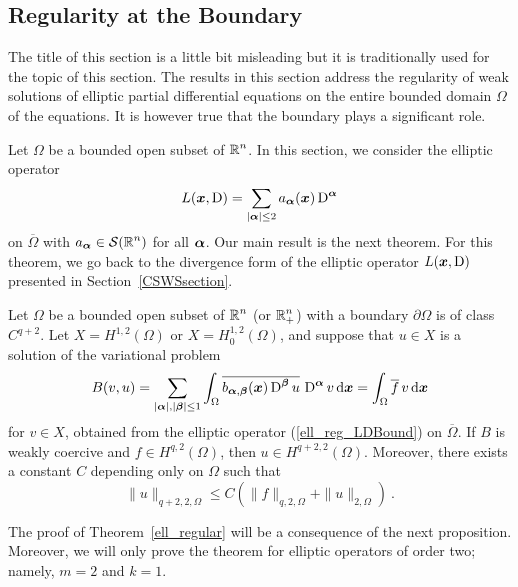 \subsection{Regularity at the Boundary} \label{ell_sect_RB}

The title of this section is a little bit misleading but it is
traditionally used for the topic of this section.
The results in this section address the regularity of weak solutions
of elliptic partial differential equations on the entire bounded
domain $\Omega$ of the equations.  It is however true that the
boundary plays a significant role.

Let $\Omega$ be a bounded open subset of $\displaystyle \mathbb{R}^n$.  In
this section, we consider the elliptic operator 
\begin{equation} \label{ell_reg_LDBound}
L({\bm{x}},\operatorname{D}) = \sum_{|{\bm{\alpha}}|\leq 2}
a_{{\bm{\alpha}}}({\bm{x}}) \operatorname{D}^{{\bm{\alpha}}}
\end{equation}
on $\overline{\Omega}$ with $\displaystyle a_{{\bm{\alpha}}} \in \mathcal{S}(\mathbb{R}^n)$
for all ${\bm{\alpha}}$.  Our main result is the next theorem.
For this theorem, we go back to the divergence form of the
elliptic operator $L({\bm{x}},\operatorname{D})$ presented in
Section~\ref{CSWSsection}.

\begin{theorem} \label{ell_regular}
Let $\Omega$ be a bounded open subset of $\displaystyle \mathbb{R}^n$
(or $\displaystyle \mathbb{R}^n_+$)
with a boundary $\partial \Omega$ is of class $\displaystyle C^{q+2}$.  Let
$\displaystyle X = H^{1,2}(\Omega)$ or
$\displaystyle X = H^{1,2}_0(\Omega)$, and suppose that
$u\in X$ is a solution of the variational problem
\[
B(v,u) = \sum_{|{\bm{\alpha}}|,|{\bm{\beta}}|\leq 1}
\int_\Omega \overline{b_{{\bm{\alpha}},{\bm{\beta}}}({\bm{x}})
\operatorname{D}^{{\bm{\beta}}} u}\, \operatorname{D}^{{\bm{\alpha}}} v
\,\mathrm{d}{{\bm{x}}} = \int_\Omega \overline{f}\,v \,\mathrm{d}{{\bm{x}}}
\]
for $\displaystyle v \in X$,
obtained from the elliptic operator (\ref{ell_reg_LDBound}) on
$\overline{\Omega}$.  If $B$ is weakly coercive and
$\displaystyle f \in H^{q,2}(\Omega)$, then
$\displaystyle u\in H^{q+2,2}(\Omega)$.  Moreover, there exists a constant $C$
depending only on $\Omega$ such that
\begin{equation} \label{ell_norm_reg}
\|u\|_{q+2,2,\Omega} \leq C \left( \|f\|_{q,2,\Omega}
+ \|u\|_{2,\Omega} \right) \ .
\end{equation}
\end{theorem}

The proof of Theorem~\ref{ell_regular} will be a consequence of the
next proposition.  Moreover, we will only prove the theorem for
elliptic operators of order two; namely, $m=2$ and $k=1$.

